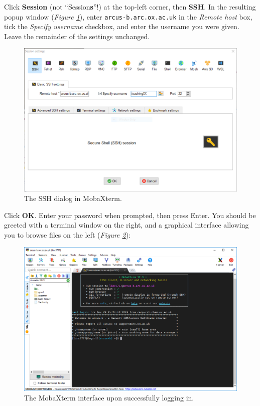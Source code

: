 \documentclass[10pt]{article}
\newcommand{\figref}[1]{\textit{Figure \ref{fig:#1}}}
\begin{document}
Click \textbf{Session} (not ``Session\textbf{s}''!) at the top-left corner, then \textbf{SSH}.  In the resulting popup window (\figref{ssh}), enter \texttt{arcus-b.arc.ox.ac.uk} in the \textit{Remote host} box, tick the \textit{Specify username} checkbox, and enter the username you were given. Leave the remainder of the settings unchanged.

\begin{figure}[H]
    \centering
    \includegraphics[scale=0.5]{./img/ssh}
    \caption{The SSH dialog in MobaXterm.}
    \label{fig:ssh}
\end{figure}

Click \textbf{OK}. Enter your password when prompted, then press Enter. You should be greeted with a terminal window on the right, and a graphical interface allowing you to browse files on the left (\figref{loggedin}):

\begin{figure}[H]
    \centering
    \includegraphics[scale=0.38]{./img/loggedin}
    \caption{The MobaXterm interface upon successfully logging in.}
    \label{fig:loggedin}
\end{figure}
\end{document}
